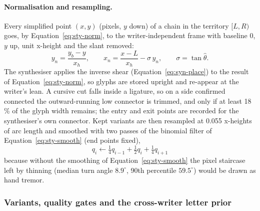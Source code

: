 \paragraph{Normalisation and resampling.}
Every simplified point $(x,y)$ (pixels, $y$ down) of a chain in the territory $[L,R)$ goes, by Equation~\ref{eq:sty-norm}, to the writer-independent frame with baseline 0, $y$ up, unit x-height and the slant removed:
\begin{equation}
y_n=\frac{y_b-y}{x_h},\qquad x_n=\frac{x-L}{x_h}-\sigma\,y_n,\qquad\sigma=\tan\hat\theta .
\label{eq:sty-norm}
\end{equation}
The synthesiser applies the inverse shear (Equation~\ref{eq:syn-place}) to the result of Equation~\ref{eq:sty-norm}, so glyphs are stored upright and re-appear at the writer's lean.
A cursive cut falls inside a ligature, so on a side confirmed connected the outward-running low connector is trimmed, and only if at least 18\,\% of the glyph width remains; the entry and exit points are recorded for the synthesiser's own connector.
Kept variants are then resampled at 0.055 x-heights of arc length and smoothed with two passes of the binomial filter of Equation~\ref{eq:sty-smooth} (end points fixed),
\begin{equation}
q_i\leftarrow\tfrac14q_{i-1}+\tfrac12q_i+\tfrac14q_{i+1}
\label{eq:sty-smooth}
\end{equation}
because without the smoothing of Equation~\ref{eq:sty-smooth} the pixel staircase left by thinning (median turn angle $8.9^\circ$, 90th percentile $59.5^\circ$) would be drawn as hand tremor.

\subsubsection{Variants, quality gates and the cross-writer letter prior}

